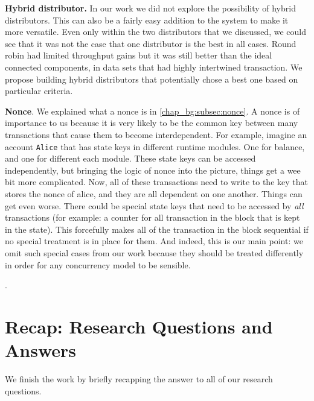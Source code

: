 \textbf{Hybrid distributor.} In our work we did not explore the possibility of hybrid distributors.
This can also be a fairly easy addition to the system to make it more versatile. Even only within
the two distributors that we discussed, we could see that it was not the case that one distributor
is the best in all cases. Round robin had limited throughput gains but it was still better than the
ideal connected components, in data sets that had highly intertwined transaction. We propose
building hybrid distributors that potentially chose a best one based on particular criteria.

\textbf{Nonce}. We explained what a nonce is in \ref{chap_bg:subsec:nonce}. A nonce is of importance
to us because it is very likely to be the common key between many transactions that cause them to
become interdependent. For example, imagine an account \texttt{Alice} that has state keys in
different runtime modules. One for balance, and one for different each module. These state keys can
be accessed independently, but bringing the logic of nonce into the picture, things get a wee bit
more complicated. Now, all of these transactions need to write to the key that stores the nonce of
alice, and they are all dependent on one another. Things can get even worse. There could be special
state keys that need to be accessed by \textit{all} transactions (for example: a counter for all
transaction in the block that is kept in the state). This forcefully makes all of the transaction in
the block sequential if no special treatment is in place for them. And indeed, this is our main
point: we omit such special cases from our work because they should be treated differently in order
for any concurrency model to be sensible.

.

\section{Recap: Research Questions and Answers}

We finish the work by briefly recapping the answer to all of our research questions.

